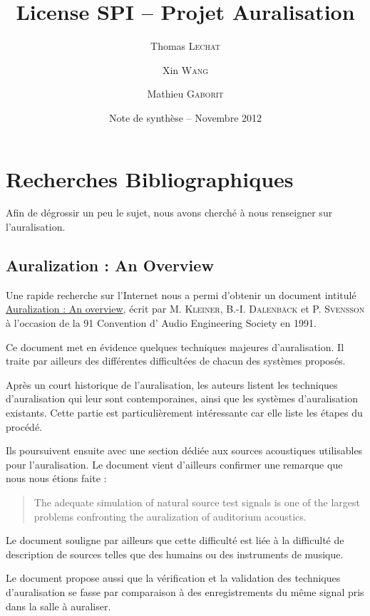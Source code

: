 \documentclass[12pt]{article}
\title{License SPI -- Projet Auralisation}
\author{Thomas \textsc{Lechat} \and Xin \textsc{Wang} \and Mathieu \textsc{Gaborit}}
\date{Note de synthèse -- Novembre 2012}
\begin{document}
  \maketitle

\tableofcontents
\newpage

\section{Recherches Bibliographiques} %

Afin de dégrossir un peu le sujet, nous avons cherché à nous renseigner sur l'auralisation.

\subsection{Auralization : An Overview}

Une rapide recherche sur l'Internet nous a permi d'obtenir un document intitulé \\\underline{Auralization : An overview}, écrit par M.
\textsc{Kleiner}, B.-I. \textsc{Dalenbäck} et P. \textsc{Svensson} à l'occasion de la 91 Convention d' Audio Engineering
Society en 1991.

Ce document met en évidence quelques techniques majeures d'auralisation. Il traite par ailleurs des différentes difficultées de chacun des systèmes proposés.

Après un court historique de l'auralisation, les auteurs listent les techniques d'auralisation qui leur sont contemporaines, ainsi que les systèmes d'auralisation existants. Cette partie est particulièrement intéressante car elle liste les étapes du procédé.

Ils poursuivent ensuite avec une section dédiée aux sources acoustiques utilisables pour l'auralisation. Le document vient d'ailleurs confirmer une remarque que nous nous étions faite :

\begin{quotation}
The adequate simulation of natural source test signals is one of the largest problems confronting the auralization of
auditorium acoustics.
\end{quotation}

Le document souligne par ailleurs que cette difficulté est liée à la difficulté de description de sources telles que des
humains ou des instruments de musique.

Le document propose aussi que la vérification et la validation des techniques d'auralisation se fasse par comparaison à
des enregistrements du même signal pris dans la salle à auraliser.
\end{document}
